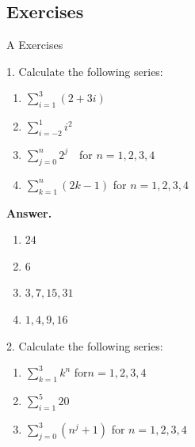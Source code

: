 \documentclass[10pt,]{book}
\theoremstyle{plain}
\theoremstyle{definition}
\theoremstyle{definition}
\theoremstyle{definition}
\theoremstyle{definition}
\begin{document}
\subsection[Exercises]{Exercises}\label{exercises-1-5}
\hypertarget{exercisegroup-9}{}\typeout{************************************************}
\typeout{************************************************}
A Exercises%
\begin{exercisegroup}
\item[1.]\hypertarget{exercise-32}{}Calculate the following series:%
\par
\leavevmode%
\begin{multicols}{2}
\begin{enumerate}[label=\alph*]
\item\hypertarget{li-220}{}  \(\sum _{i=1}^3 (2 + 3i)\)%
\item\hypertarget{li-221}{}  \(\sum _{i=-2}^1 i^2\) %
\item\hypertarget{li-222}{}  \(\sum _{j=0}^n 2^j\text{   }\) for \(n= 1, 2, 3, 4\)%
\item\hypertarget{li-223}{}  \(\sum _{k=1}^n (2k-1)\) for \(n = 1, 2, 3, 4\) %
\end{enumerate}
\end{multicols}
%
\par\smallskip
\par\smallskip
\noindent\textbf{Answer.}\hypertarget{answer-17}{}\quad
\leavevmode%
\begin{multicols}{2}
\begin{enumerate}[label=\alph*]
\item\hypertarget{li-224}{} \(24\)%
\item\hypertarget{li-225}{} \(6\)%
\item\hypertarget{li-226}{} \(3,7,15,31\)%
\item\hypertarget{li-227}{} \(1,4,9,16\)%
\end{enumerate}
\end{multicols}
%
\item[2.]\hypertarget{exercise-33}{} Calculate the following series: %
\par
\leavevmode%
\begin{enumerate}[label=\alph*]
\item\hypertarget{li-228}{}  \(\sum _{k=1}^3 k^n\) for\(n = 1, 2, 3, 4\) %
\item\hypertarget{li-229}{}  \(\sum _{i=1}^5 20\) %
\item\hypertarget{li-230}{}   \(\sum _{j=0}^3 \left(n^j+1\right)\) for \(n = 1, 2, 3,4\) %

\end{enumerate}
\end{exercisegroup}
\end{document}

